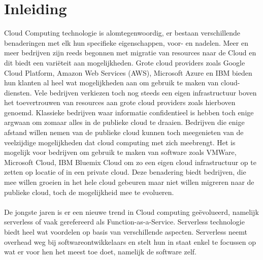 
\chapter{Inleiding}
\label{ch:inleiding}

Cloud Computing technologie is alomtegenwoordig, er bestaan verschillende benaderingen met elk hun specifieke eigenschappen, voor- en nadelen. Meer en meer bedrijven zijn reeds begonnen met migratie van resources naar de Cloud en dit biedt een variëteit aan mogelijkheden. Grote cloud providers zoals Google Cloud Platform, Amazon Web Services (AWS), Microsoft Azure en IBM bieden hun klanten al heel wat mogelijkheden aan om gebruik te maken van cloud-diensten. Vele bedrijven verkiezen toch nog steeds een eigen infrastructuur boven het toevertrouwen van resources aan grote cloud providers zoals hierboven genoemd. Klassieke bedrijven waar informatie confidentieel is hebben toch enige argwaan om zomaar alles in de publieke cloud te draaien. Bedrijven die enige afstand willen nemen van de publieke cloud kunnen toch meegenieten van de veelzijdige mogelijkheden dat cloud computing met zich meebrengt. Het is mogelijk voor bedrijven om gebruik te maken van software zoals VMWare, Microsoft Cloud, IBM Bluemix Cloud om zo een eigen cloud infrastructuur op te zetten op locatie of in een private cloud. Deze benadering biedt bedrijven, die mee willen groeien in het hele cloud gebeuren maar niet willen migreren naar de publieke cloud, toch de mogelijkheid mee te evolueren.
\\\\

De jongste jaren is er een nieuwe trend in Cloud computing geëvolueerd, namelijk serverless of vaak gerefereerd als Function-as-a-Service. Serverless technologie biedt heel wat voordelen op basis van verschillende aspecten. Serverless neemt overhead weg bij softwareontwikkelaars en stelt hun in staat enkel te focussen op wat er voor hen het meest toe doet, namelijk de software zelf.
\\\\

